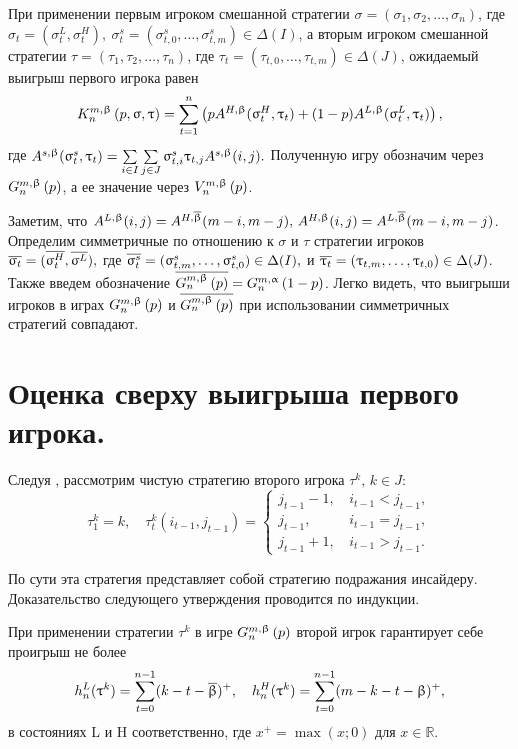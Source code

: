 При применении первым игроком смешанной стратегии $\sigma = (\sigma_1, \sigma_2,
\ldots, \sigma_n)$, где $\sigma_t = (\sigma_t^L, \sigma_t^H),\ \sigma^s_t =
(\sigma^s_{t,0}, \ldots, \sigma^s_{t,m}) \in \Delta(I)$, а вторым игроком
смешанной стратегии $\tau = (\tau_1, \tau_2, \ldots, \tau_n)$, где $ \tau_t =
(\tau_{t,0}, \ldots, \tau_{t,m}) \in \Delta(J)$, ожидаемый выигрыш первого
игрока равен
\begin{equation}
  \label{eq:firstPlayerPayoff}
  \firstPlayerPayoff{n}{p}{\sigma}{\tau} = \sum_{t=1}^n
  \left(
    pA^{H,\Co}(\sigma_t^H, \tau_t) + (1 - p)A^{L,\Co}(\sigma_t^L, \tau_t)
  \right),
\end{equation}
где $ A^{s,\Co}(\sigma^s_t,\tau_t) = \sum\limits_{i \in I} \sum\limits_{j \in
  J} \sigma^s_{t, i} \tau_{t, j} A^{s,\Co}(i, j). $ Полученную игру обозначим
через $\generalGame{n}{p}$, а ее значение через $\gameValue{n}{p}$.

Заметим, что $A^{L,\Co}(i,j) = A^{H,\DCo}(m-i,m-j), \, A^{H,\Co}(i,j) =
A^{L,\DCo}(m-i,m-j)$. Определим симметричные по отношению к $\sigma$ и $\tau$
стратегии игроков $ \symm{\sigma_t} = (\symm{\sigma^H_t}, \symm{\sigma^L}), $
где $ \symm{\sigma^s_t} = (\sigma^s_{t,m},\ldots,\sigma^s_{t,0}) \in \Delta(I),
$ и $ \symm{\tau_t} = (\tau_{t,m},\ldots,\tau_{t,0}) \in \Delta(J) $. Также
введем обозначение $\symm{\generalGame{n}{p}} = \symmGameExpression[n]{1-p}$.
Легко видеть, что выигрыши игроков в играх $\generalGame{n}{p}$ и
$\symm{\generalGame{n}{p}}$ при использовании симметричных стратегий совпадают.

\section{Оценка сверху выигрыша первого игрока.}
Следуя \cite{domansky07}, рассмотрим чистую стратегию второго игрока $\tau^k, \,
k \in J$:
\[
  \tau^k_1 = k, \quad \tau^k_t(i_{t-1}, j_{t-1}) = \begin{cases}
    j_{t-1} - 1, & \, i_{t-1} < j_{t-1}, \\
    j_{t-1},     & \, i_{t-1} = j_{t-1}, \\
    j_{t-1} + 1, & \, i_{t-1} > j_{t-1}.
  \end{cases}
\]

По сути эта стратегия представляет собой стратегию подражания инсайдеру.
Доказательство следующего утверждения проводится по индукции.

\begin{proposition}
  \label{proposition:secondPlayerStrategyPayoffs}
  При применении стратегии $\tau^k$ в игре $\generalGame{n}{p}$ второй игрок
  гарантирует себе проигрыш не более
  \[
    h_n^L(\tau^k) = \sum_{t=0}^{n-1}(k - t - \DCo)^+, \quad h_n^H(\tau^k) =
    \sum_{t=0}^{n-1}(m - k - t - \Co)^+,
  \]
  в состояниях L и H соответственно, где $x^+ = \max(x; 0)$ для $x \in
  \mathbb{R}$.
\end{proposition}

